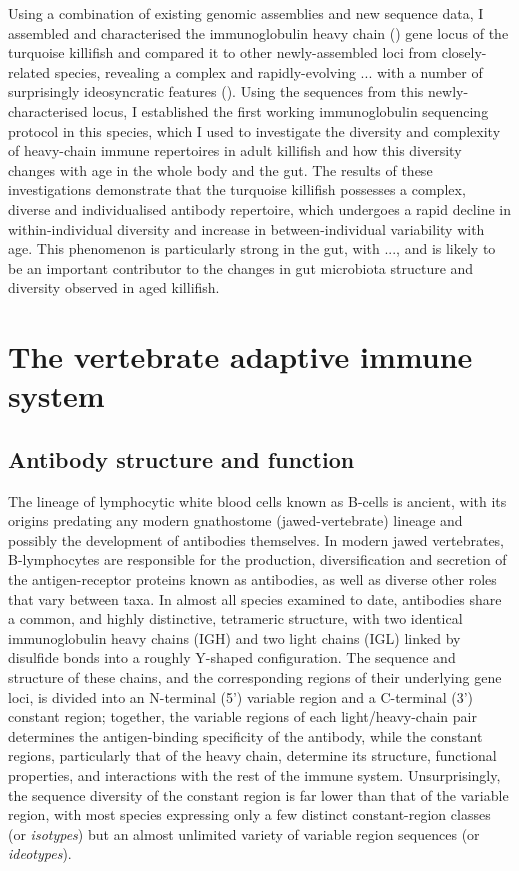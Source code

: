 Using a combination of existing genomic assemblies and new sequence data, I assembled and characterised the immunoglobulin heavy chain (\igh{}) gene locus of the turquoise killifish and compared it to other newly-assembled loci from closely-related species, revealing a complex and rapidly-evolving ... with a number of surprisingly ideosyncratic features (). Using the sequences from this newly-characterised locus, I established the first working immunoglobulin sequencing protocol in this species, which I used to investigate the diversity and complexity of heavy-chain immune repertoires in adult killifish and how this diversity changes with age in the whole body and the gut. The results of these investigations demonstrate that the turquoise killifish possesses a complex, diverse and individualised antibody repertoire, which undergoes a rapid decline in within-individual diversity and increase in between-individual variability with age. This phenomenon is particularly strong in the gut, with ..., and is likely to be an important contributor to the changes in gut microbiota structure and diversity observed in aged killifish. %



\section{The vertebrate adaptive immune system} %

\subsection{Antibody structure and function}

The lineage of lymphocytic white blood cells known as B-cells is ancient, with its origins predating any modern gnathostome (jawed-vertebrate) lineage and possibly the development of antibodies themselves. In modern jawed vertebrates, B-lymphocytes are responsible for the production, diversification and secretion of the antigen-receptor proteins known as antibodies, as well as diverse other roles that vary between taxa. In almost all species examined to date, antibodies share a common, and highly distinctive, tetrameric structure, with two identical immunoglobulin heavy chains (IGH) and two light chains (IGL) linked by disulfide bonds into a roughly Y-shaped configuration. The sequence and structure of these chains, and the corresponding regions of their underlying gene loci, is divided into an N-terminal (5') variable region and a C-terminal (3') constant region; together, the variable regions of each light/heavy-chain pair determines the antigen-binding specificity of the antibody, while the constant regions, particularly that of the heavy chain, determine its structure, functional properties, and interactions with the rest of the immune system. Unsurprisingly, the sequence diversity of the constant region is far lower than that of the variable region, with most species expressing only a few distinct constant-region classes (or \textit{isotypes}) but an almost unlimited variety of variable region sequences (or \textit{ideotypes}).

